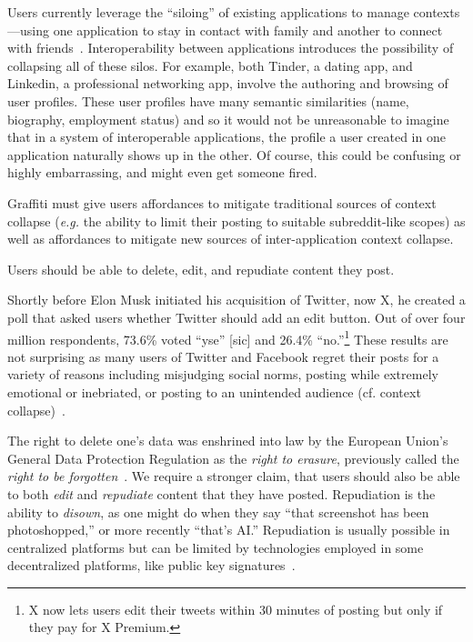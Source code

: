 Users currently leverage the ``siloing'' of existing applications to manage contexts---using
one application to stay in contact with family and another to connect with friends~\cite{whatsappforfamily}.
Interoperability between applications introduces the possibility
of collapsing all of these silos.
For example, both Tinder, a dating app, and Linkedin, a professional networking app, involve the authoring
and browsing of user profiles.
These user profiles have many semantic similarities (name, biography, employment status) and so
it would not be unreasonable to imagine that in a system of interoperable applications,
the profile a user created in one application
naturally shows up in the other.
Of course, this could be confusing or highly embarrassing, and might even get someone fired.

Graffiti must give users affordances to mitigate traditional sources
of context collapse (\emph{e.g.} the ability to limit their posting to suitable subreddit-like scopes)
as well as affordances to mitigate new sources of inter-application context collapse.


\begin{requirement}[Forgiving]
\label{requirements:forgiving}
    Users should be able to delete, edit, and repudiate content they post.
\end{requirement}

Shortly before Elon Musk initiated his acquisition of Twitter, now X,
he created a poll that asked users whether Twitter should add an edit button.
Out of over four million respondents, 73.6\% voted ``yse'' [sic] and 26.4\% ``no.''\footnote{
  X now lets users edit their tweets within 30 minutes of posting but only
  if they pay for X Premium.
} These results are not surprising as many users of Twitter and Facebook regret
their posts for a variety of reasons
including misjudging social norms, posting while extremely emotional or inebriated,
or posting to an unintended audience (cf. context collapse)~\cite{regret, regrettwitter}.

The right to delete one's data was enshrined into law by the European Union's
General Data Protection Regulation as
the \emph{right to erasure}, previously called the \emph{right to be forgotten}~\cite{gdpr}.
We require a stronger claim, that users should also be able to both \emph{edit}
and \emph{repudiate} content that they have posted. Repudiation is the ability to \emph{disown},
as one might do when they say ``that screenshot has been photoshopped,''
or more recently ``that's AI.'' Repudiation is usually possible in centralized platforms
but can be limited by technologies employed in some decentralized platforms,
like public key signatures~\cite{offtherecord}.

